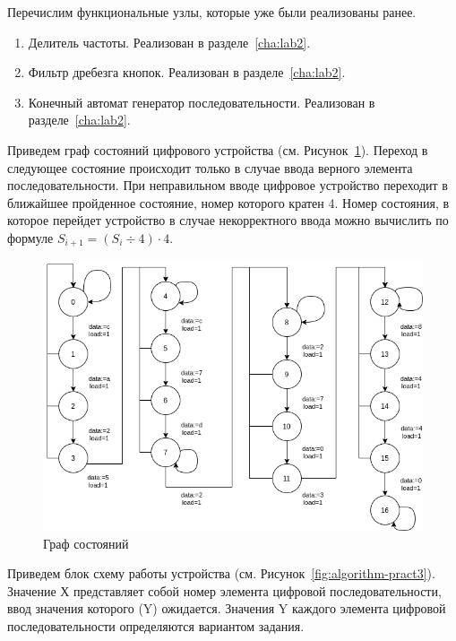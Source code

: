 Перечислим функциональные узлы, которые уже были реализованы ранее. 

\begin{enumerate}
	\item Делитель частоты. Реализован в разделе~\ref{cha:lab2}.
	\item Фильтр дребезга кнопок. Реализован в разделе~\ref{cha:lab2}.
	\item Конечный автомат генератор последовательности. Реализован в разделе~\ref{cha:lab2}.
\end{enumerate}

Приведем граф состояний цифрового устройства (см. Рисунок~\ref{fig:state-graph-pract3}). Переход в следующее состояние происходит только в случае ввода верного элемента последовательности. При неправильном вводе цифровое устройство переходит в ближайшее пройденное состояние, номер которого кратен 4. Номер состояния, в которое перейдет устройство в случае некорректного ввода можно вычислить по формуле $S_{i+1}=(S_i \div 4) \cdot 4$.

\begin{figure}[h!]
	\centering
	\includegraphics[width=0.7\linewidth]{course-plis/images/lab3/state-graph-pract3}
	\caption{Граф состояний}
	\label{fig:state-graph-pract3}
\end{figure}

Приведем блок схему работы устройства (см. Рисунок~\ref{fig:algorithm-pract3}). Значение Х представляет
собой номер элемента цифровой последовательности, ввод значения которого (Y)
ожидается. Значения Y каждого элемента цифровой последовательности определяются
вариантом задания.

